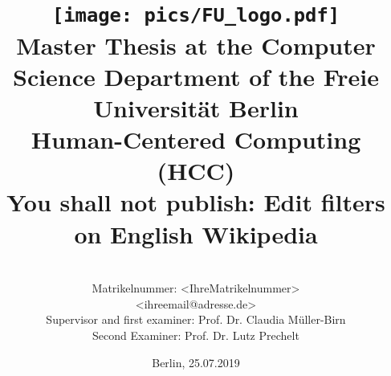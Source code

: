 %
\begin{titlepage}

\title{\texttt{[image: pics/FU\_logo.pdf]}\\
{\small Master Thesis at the Computer Science Department of the Freie Universität Berlin}\\
{\small Human-Centered Computing (HCC)}\\
[6ex]
{\LARGE You shall not publish: Edit filters on English Wikipedia}}

\author{
{\emph{}}\\
{\normalsize Matrikelnummer: <IhreMatrikelnummer>}\\
{\normalsize <ihreemail@adresse.de>}\\
[18ex]
{\normalsize Supervisor and first examiner: Prof. Dr. Claudia Müller-Birn} \\
{\normalsize Second Examiner: Prof. Dr. Lutz Prechelt}}
\vspace{6ex}
\date{\normalsize Berlin, 25.07.2019}

\maketitle

\end{titlepage}
